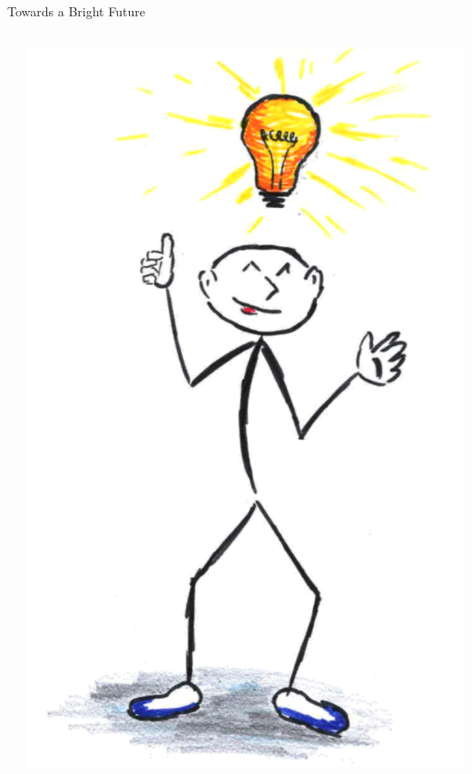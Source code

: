 \documentclass[aspectratio=169,10pt]{beamer}
\newif\ifbackup
\begin{document}
\begin{frame}{Towards a Bright Future}
  
    \begin{columns}
      \begin{column}{11.5cm}
          
      \end{column}
      \begin{column}{4.cm}
       \includegraphics[width=\textwidth]{general/idea.pdf}
      \end{column}
    \end{columns}
  \end{frame}
 
 \ifbackup
  
\frame{
  \begin{center}
    \huge{\textcolor{AliceBlue}{Backup Slides}}
  \end{center}
}
\end{document}
